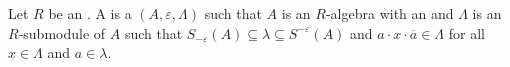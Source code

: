 \begin{definition} \label{definition:unitary_algebra_over_an_involution_ring}
    Let $R$ be an . 
    A  is a  $(A, \varepsilon, \Lambda)$ such that $A$ is an $R$-algebra with an  and $\Lambda$ is an $R$-submodule of $A$ such that $S_{-\varepsilon}(A) \subseteq \lambda \subseteq S^{-\varepsilon}(A)$ and $a \cdot x \cdot \overline{a} \in \Lambda$ for all $x \in \Lambda$ and $a \in \lambda$. 

\end{definition}
